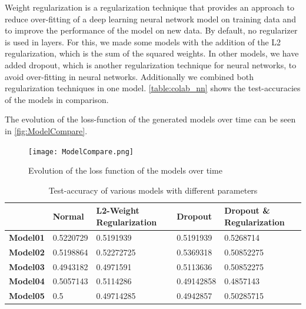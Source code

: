 Weight regularization is a regularization technique that provides an approach to reduce over-fitting of a deep learning neural network model on training data and to improve the performance of the model on new data.\newline
By default, no regularizer is used in layers. For this, we made some models with the addition of the L2 regularization, which is the sum of the squared weights.\newline \newline
In other models, we have added dropout, which is another regularization technique for neural networks, to avoid over-fitting in neural networks. Additionally we combined both regularization techniques in one model. \autoref{table:colab_nn} shows the test-accuracies of the models in comparison.

The evolution of the loss-function of the generated models over time can be seen in \autoref{fig:ModelCompare}.

\begin{figure}[H]
\begin{center}
\texttt{[image: ModelCompare.png]}
\end{center}
\caption{Evolution of the loss function of the models over time}
\label{fig:ModelCompare}
\end{figure}

\begin{table}
\centering
\begin{tabular}{|p{2cm}|p{2cm}|p{3cm}|p{2cm}|p{3cm}|}
\hline
 & \textbf{Normal} & \textbf{L2-Weight \newline Regularization} & \textbf{Dropout} & \textbf{Dropout \& \newline Regularization} \\ \hline
\textbf{Model01} & 0.5220729 & 0.5191939 & 0.5191939 & 0.5268714 \\ \hline
\textbf{Model02} & 0.5198864 & 0.52272725 & 0.5369318 & 0.50852275 \\ \hline
\textbf{Model03} & 0.4943182 & 0.4971591 & 0.5113636 & 0.50852275 \\ \hline
\textbf{Model04} & 0.5057143 & 0.5114286 & 0.49142858 & 0.4857143 \\ \hline
\textbf{Model05} & 0.5 & 0.49714285 & 0.4942857 & 0.50285715 \\ \hline

\end{tabular}
\caption{Test-accuracy of various models with different parameters}
\label{table:colab_nn}
\end{table}

